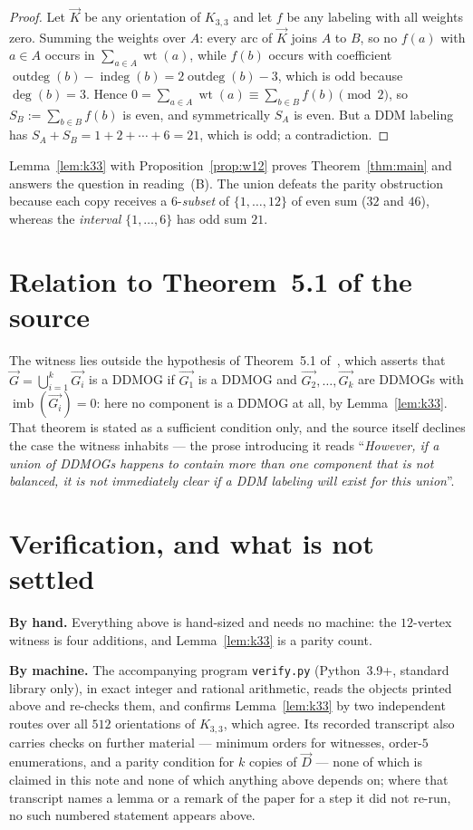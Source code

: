 \documentclass[11pt]{amsart}
\DeclareMathOperator{\wt}{wt}
\DeclareMathOperator{\imb}{imb}
\newcommand{\ora}[1]{\overrightarrow{#1}}
\begin{document}
\begin{proof}
Let $\ora{K}$ be any orientation of $K_{3,3}$ and let $f$ be any labeling with all weights
zero. Summing the weights over $A$: every arc of $\ora{K}$ joins $A$ to $B$, so no $f(a)$ with
$a\in A$ occurs in $\sum_{a\in A}\wt(a)$, while $f(b)$ occurs with coefficient
$\operatorname{outdeg}(b)-\operatorname{indeg}(b)=2\operatorname{outdeg}(b)-3$, which is odd
because $\deg(b)=3$. Hence $0=\sum_{a\in A}\wt(a)\equiv\sum_{b\in B}f(b)\pmod 2$, so
$S_B:=\sum_{b\in B}f(b)$ is even, and symmetrically $S_A$ is even. But a DDM labeling has
$S_A+S_B=1+2+\cdots+6=21$, which is odd; a contradiction.
\end{proof}

Lemma~\ref{lem:k33} with Proposition~\ref{prop:w12} proves Theorem~\ref{thm:main} and answers
the question in reading~(B). The
union defeats the parity obstruction because each copy receives a $6$-\emph{subset} of
$\{1,\dots,12\}$ of even sum ($32$ and $46$), whereas the \emph{interval} $\{1,\dots,6\}$ has
odd sum $21$.

\section{Relation to Theorem~5.1 of the source}\label{sec:src}

The witness lies outside the hypothesis of Theorem~5.1 of~\cite{Source}, which asserts that
$\ora{G}=\bigcup_{i=1}^{k}\ora{G_i}$ is a DDMOG if $\ora{G_1}$ is a DDMOG and
$\ora{G_2},\dots,\ora{G_k}$ are DDMOGs with $\imb(\ora{G_i})=0$: here no component is a DDMOG
at all, by Lemma~\ref{lem:k33}. That theorem is stated as a sufficient condition only, and the
source itself declines the case the witness inhabits --- the prose introducing it reads
``\emph{However, if a union of DDMOGs happens to contain more than one component that is not
balanced, it is not immediately clear if a DDM labeling will exist for this union}''.

\section{Verification, and what is not settled}\label{sec:ver}

\noindent\textbf{By hand.} Everything above is hand-sized and needs no machine: the
$12$-vertex witness is four additions, and Lemma~\ref{lem:k33} is a parity count.

\medskip\noindent\textbf{By machine.} The accompanying program \texttt{verify.py}
(Python~3.9+, standard library only), in exact integer and rational arithmetic, reads the
objects printed above and re-checks them, and confirms Lemma~\ref{lem:k33} by two independent
routes over all $512$ orientations of $K_{3,3}$, which agree. Its recorded transcript also
carries checks on further material --- minimum orders for witnesses, order-$5$ enumerations, and
a parity condition for $k$ copies of $\ora{D}$ --- none of which is claimed in this note and
none of which anything above depends on; where that transcript names a lemma or a remark of the
paper for a step it did not re-run, no such numbered statement appears above.
\end{document}
